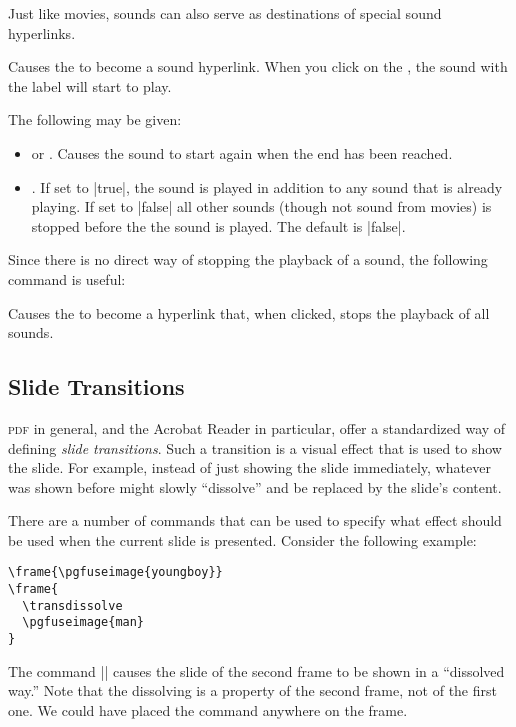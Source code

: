 Just like movies, sounds can also serve as  destinations of special
sound hyperlinks.

\begin{command}{\hyperlinksound{}}
  Causes the  to become a sound hyperlink. When you click
  on the , the sound with the label  will
  start to play.

  The following  may be given:
  \begin{itemize}
  \item
     or . Causes the sound to start
    again when the end has been reached.
  \item
    . If set to |true|, the
    sound is played in addition to any sound that is already
    playing. If set to |false| all other sounds (though not sound from
    movies) is stopped before the the sound is played. The default is
    |false|.
  \end{itemize}
\end{command}

Since there is no direct way of stopping the playback of a sound, the
following command is useful:


\begin{command}{\hyperlinkmute{}}
  Causes the  to become a hyperlink that, when clicked,
  stops the playback of all sounds.
\end{command}




\subsection{Slide Transitions}

\textsc{pdf} in general, and the Acrobat Reader in particular, offer a
standardized way of defining \emph{slide transitions}. Such a
transition is a visual effect that is used to show the slide. For
example, instead of just showing the slide immediately, whatever was
shown before might slowly ``dissolve'' and be replaced by the slide's
content.

There are a number of commands that can be used to specify what effect
should be used when the current slide is presented. Consider the
following example:

\begin{verbatim}
\frame{\pgfuseimage{youngboy}}
\frame{
  \transdissolve
  \pgfuseimage{man}
}
\end{verbatim}
The command |\transdissolve| causes the slide of the
second frame to be shown in a ``dissolved way.'' Note that the
dissolving is a property of the second frame, not of the first one. We
could have placed the command anywhere on the frame.

